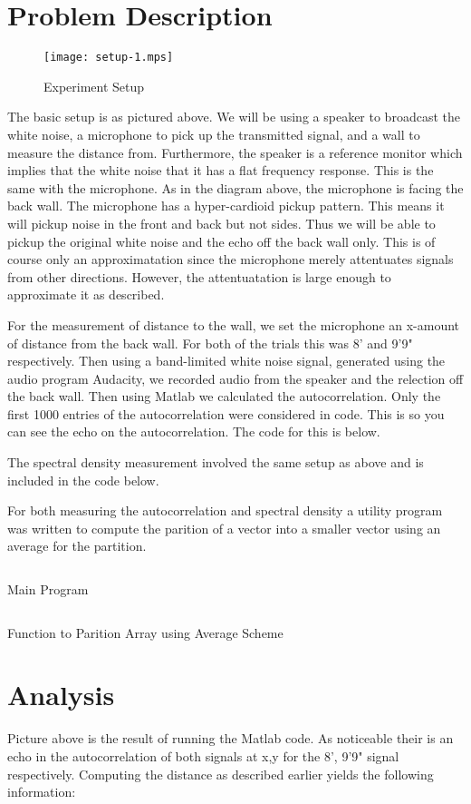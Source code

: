 \documentclass{article}
\begin{document}
      \section{Problem Description}
      \begin{figure}[H]
         \texttt{[image: setup-1.mps]}
         \caption{Experiment Setup}
      \end{figure}
      The basic setup is as pictured above. We will be using a speaker to
      broadcast the white noise, a microphone to pick up the transmitted signal,
      and a wall to measure the distance from. Furthermore, the speaker is
      a reference monitor which implies that the white noise that it has
      a flat frequency response. This is the same with the microphone.
      As in the diagram above, the microphone is facing the back wall. The
      microphone has a hyper-cardioid pickup pattern. This means it will
      pickup noise in the front and back but not sides. Thus we will be
      able to pickup the original white noise and the echo off the back
      wall only. This is of course only an approximatation since the microphone
      merely attentuates signals from other directions. However, the
      attentuatation is large enough to approximate it as described.

      For the measurement of distance to the wall, we set the microphone
      an x-amount of distance from the back wall. For both of the trials this
      was 8' and 9'9" respectively. Then using a band-limited white noise
      signal, generated using the audio program Audacity, we recorded audio
      from the speaker and the relection off the back wall. Then using Matlab
      we calculated the autocorrelation. Only the first 1000 entries of the
      autocorrelation were considered in code. This is so you can see the
      echo on the autocorrelation.
      The code for this is below.

      The spectral density measurement involved the same setup as above
      and is included in the code below.

      For both measuring the autocorrelation and spectral density a
      utility program was written to compute the parition of a vector
      into a smaller vector using an average for the partition.

      \begin{listing}[H]
         \inputminted[linenos]{matlab}{../main.m}
         \caption{Main Program}
      \end{listing}
      \begin{listing}[H]
         \inputminted[linenos]{matlab}{../partition.m}
         \caption{Function to Parition Array using Average Scheme}
      \end{listing}
   \section{Analysis}
      Picture above is the result of running the Matlab code.
      As noticeable their is an echo in the autocorrelation of both signals
      at {x,y} for the {8', 9'9"} signal respectively. Computing the
      distance as described earlier yields the following information:
      \begin{table}
      \end{table}
\end{document}
